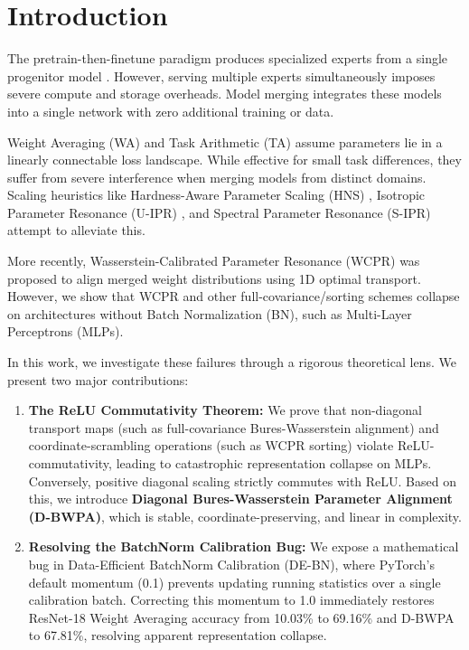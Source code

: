 \documentclass{article}
\theoremstyle{plain}
\theoremstyle{definition}
\theoremstyle{remark}
\begin{document}
\section{Introduction}
\label{sec:intro}

The pretrain-then-finetune paradigm produces specialized experts from a single progenitor model \cite{model_soup, task_arithmetic}. However, serving multiple experts simultaneously imposes severe compute and storage overheads. Model merging integrates these models into a single network with zero additional training or data.

Weight Averaging (WA) \cite{fedavg, weight_averaging} and Task Arithmetic (TA) \cite{task_arithmetic} assume parameters lie in a linearly connectable loss landscape. While effective for small task differences, they suffer from severe interference when merging models from distinct domains. Scaling heuristics like Hardness-Aware Parameter Scaling (HNS) \cite{hns}, Isotropic Parameter Resonance (U-IPR) \cite{ipr}, and Spectral Parameter Resonance (S-IPR) \cite{s_ipr} attempt to alleviate this.

More recently, Wasserstein-Calibrated Parameter Resonance (WCPR) \cite{wcpr} was proposed to align merged weight distributions using 1D optimal transport. However, we show that WCPR and other full-covariance/sorting schemes collapse on architectures without Batch Normalization (BN), such as Multi-Layer Perceptrons (MLPs).

In this work, we investigate these failures through a rigorous theoretical lens. We present two major contributions:
\begin{enumerate}
  \item \textbf{The ReLU Commutativity Theorem:} We prove that non-diagonal transport maps (such as full-covariance Bures-Wasserstein alignment) and coordinate-scrambling operations (such as WCPR sorting) violate ReLU-commutativity, leading to catastrophic representation collapse on MLPs. Conversely, positive diagonal scaling strictly commutes with ReLU. Based on this, we introduce \textbf{Diagonal Bures-Wasserstein Parameter Alignment (D-BWPA)}, which is stable, coordinate-preserving, and linear in complexity.
  \item \textbf{Resolving the BatchNorm Calibration Bug:} We expose a mathematical bug in Data-Efficient BatchNorm Calibration (DE-BN), where PyTorch's default momentum (0.1) prevents updating running statistics over a single calibration batch. Correcting this momentum to 1.0 immediately restores ResNet-18 Weight Averaging accuracy from 10.03\% to 69.16\% and D-BWPA to 67.81\%, resolving apparent representation collapse.
\end{enumerate}
\end{document}
